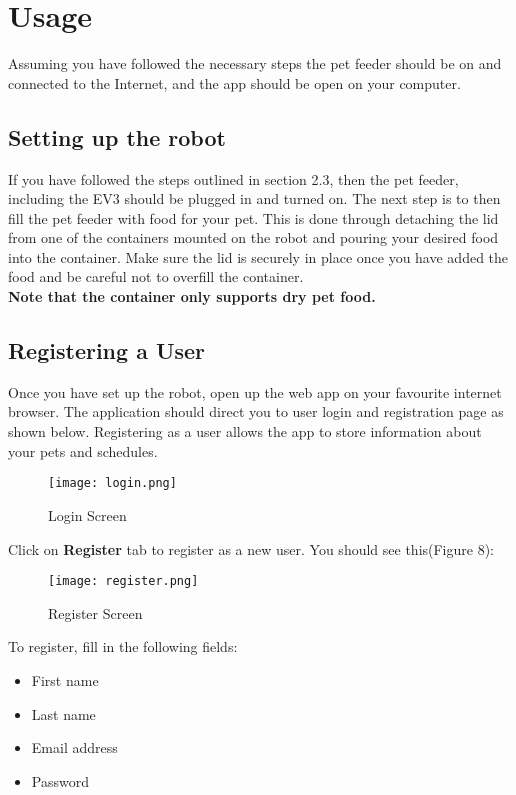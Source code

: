 \section{Usage}
Assuming you have followed the necessary steps the pet feeder should be on and connected to the Internet, and the app should be open on your computer.		

    \subsection{Setting up the robot}
    If you have followed the steps outlined in section 2.3, then the pet feeder, including the EV3 should be plugged in and turned on. The next step is to then fill the pet feeder with food for your pet. This is done through detaching the lid from one of the containers mounted on the robot and pouring your desired food into the container. Make sure the lid is securely in place once you have added the food and be careful not to overfill the container. \\
    \textbf{Note that the container only supports dry pet food.}
    
    \subsection{Registering a User}

    Once you have set up the robot, open up the web app on your favourite internet browser. The application should direct you to user login and registration page as shown below. Registering as a user allows the app to store information about your pets and schedules.
    
    \newpage
    
    \begin{figure}
        \centering
        \texttt{[image: login.png]}
         \caption{Login Screen}
     \end{figure}
     
    Click on \textbf{Register} tab to register as a new user. You should see this(Figure 8):
    
    \begin{figure}
        \centering
        \texttt{[image: register.png]}
         \caption{Register Screen}
        \end{figure}
    
    To register, fill in the following fields:
    \begin{itemize}
        \item First name
        \item Last name
        \item Email address
        \item Password 
    \end{itemize}
    
